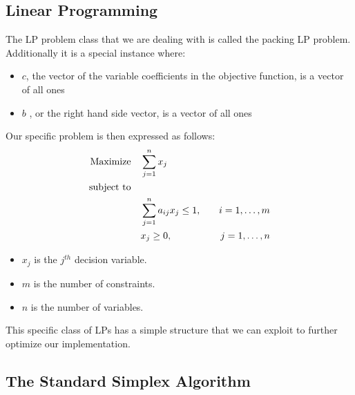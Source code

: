 \subsection{Linear Programming}
The LP problem class that we are dealing with is called the packing LP problem. Additionally
it is a special instance where:
\begin{itemize}
    \item \( c \), the vector of the variable coefficients in the objective function,
    is a vector of all ones
    \item \( b \) , or the right hand side vector,  is a vector of all ones
\end{itemize}
Our specific problem is then expressed as follows:
\begin{align}
    \text{Maximize} \quad & \sum_{j=1}^{n} x_j \notag \\
    \text{subject to} \quad & \notag \\
    & \sum_{j=1}^{n} a_{ij} x_j \leq 1, \quad & i = 1, \ldots, m \notag \\
    & x_j \geq 0, \quad & j = 1, \ldots, n \label{LP_Problem}
\end{align}
\begin{itemize}
    \item \( x_j \) is the \( j^{th} \) decision variable.
    \item \( m \) is the number of constraints.
    \item \( n \) is the number of variables.
\end{itemize}
This specific class of LPs has a simple structure that we can exploit
to further optimize our implementation.


\subsection{The Standard Simplex Algorithm}
